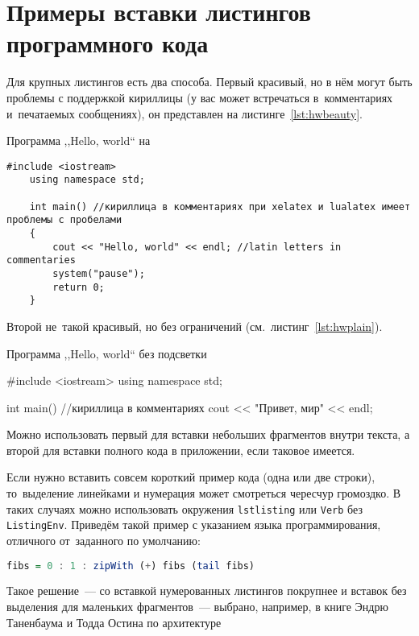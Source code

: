 \begingroup
\captiondelim{ } %
    
\endgroup

\chapter{Примеры вставки листингов программного кода}\label{app:A}

Для крупных листингов есть два способа. Первый красивый, но в нём могут быть
проблемы с поддержкой кириллицы (у вас может встречаться в~комментариях
и~печатаемых сообщениях), он представлен на листинге~\ref{lst:hwbeauty}.
\begin{ListingEnv}[!h]%
    \captiondelim{ } %
    \caption{Программа ,,Hello, world`` на \protect\cpp}\label{lst:hwbeauty}
    \begin{lstlisting}[language={[ISO]C++}]
	#include <iostream>
	using namespace std;

	int main() //кириллица в комментариях при xelatex и lualatex имеет проблемы с пробелами
	{
		cout << "Hello, world" << endl; //latin letters in commentaries
		system("pause");
		return 0;
	}
    \end{lstlisting}
\end{ListingEnv}%
Второй не~такой красивый, но без ограничений (см.~листинг~\ref{lst:hwplain}).
\begin{ListingEnv}[!h]
    \captiondelim{ } %
    \caption{Программа ,,Hello, world`` без подсветки}\label{lst:hwplain}
    \begin{Verb}

        #include <iostream>
        using namespace std;

        int main() //кириллица в комментариях
        {
            cout << "Привет, мир" << endl;
        }
    \end{Verb}
\end{ListingEnv}

Можно использовать первый для вставки небольших фрагментов
внутри текста, а второй для вставки полного
кода в приложении, если таковое имеется.

Если нужно вставить совсем короткий пример кода (одна или две строки),
то~выделение  линейками и нумерация может смотреться чересчур громоздко.
В таких случаях можно использовать окружения \texttt{lstlisting} или
\texttt{Verb} без \texttt{ListingEnv}. Приведём такой пример
с указанием языка программирования, отличного от~заданного по умолчанию:
\begin{lstlisting}[language=Haskell]
fibs = 0 : 1 : zipWith (+) fibs (tail fibs)
\end{lstlisting}
Такое решение~--- со вставкой нумерованных листингов покрупнее
и вставок без выделения для маленьких фрагментов~--- выбрано,
например, в книге Эндрю Таненбаума и Тодда Остина по архитектуре

